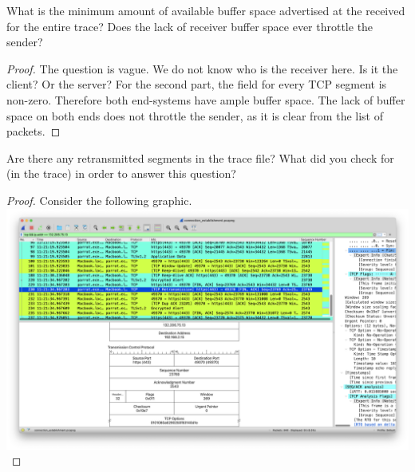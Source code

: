 \documentclass[../main.tex]{subfiles}
\begin{document}
\begin{wts}
	What is the minimum amount of available buffer space advertised at the received for the entire trace? Does the lack of receiver buffer space ever throttle the sender?
\end{wts}
\begin{proof}
    The question is vague. We do not know who is the receiver here. Is it the client? Or the server? For the second part, the  field for every TCP segment is non-zero. Therefore both end-systems have ample buffer space. The lack of buffer space on both ends does not throttle the sender, as it is clear from the list of packets.
\end{proof}
\newpage

\begin{wts}
	Are there any retransmitted segments in the trace file? What did you check for (in the trace) in order to answer this question?
\end{wts}
\begin{proof}
    Consider the following graphic.\\
    \includegraphics[width=\textwidth]{./images/RETRANSMISSION_SEGMENT_230_Q13}
\end{proof}
\newpage
\end{document}
